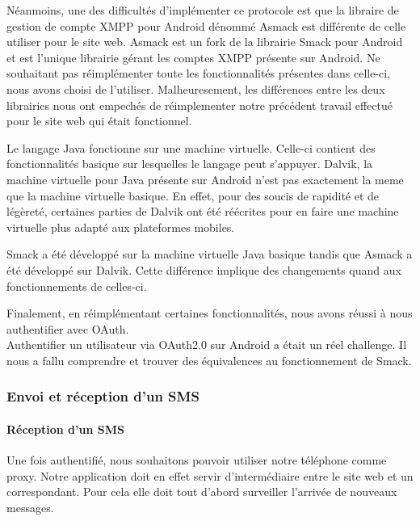 Néanmoins, une des difficultés d'implémenter ce protocole est que la libraire de gestion de compte
XMPP pour Android dénommé Asmack est différente de celle utiliser pour le site web. Asmack est un fork 
de la librairie Smack pour Android et est l'unique librairie gérant les comptes XMPP présente sur
Android. Ne souhaitant pas réimplémenter toute les fonctionnalités présentes dans celle-ci, nous avons
choisi de l'utiliser. Malheuresement, les différences entre les deux librairies nous ont empechés de 
réimplementer notre précédent travail effectué pour le site web qui était fonctionnel. 

Le langage Java fonctionne sur une machine virtuelle. Celle-ci contient des fonctionnalités basique sur
lesquelles le langage peut s'appuyer. Dalvik, la machine virtuelle pour Java présente sur Android n'est 
pas exactement la meme que la machine virtuelle basique. En effet, pour des soucis de rapidité et de 
légèreté, certaines parties de Dalvik ont été réécrites pour en faire une machine virtuelle plus adapté
aux plateformes mobiles.

Smack a été développé sur la machine virtuelle Java basique tandis que Asmack a été développé sur Dalvik.
Cette différence implique des changements quand aux fonctionnements de celles-ci. 

Finalement, en réimplémentant certaines fonctionnalités, nous avons réussi à nous authentifier avec OAuth.
\\


Authentifier un utilisateur via OAuth2.0 sur Android a était un réel challenge. Il nous a fallu comprendre 
et trouver des équivalences au fonctionnement de Smack. 



\subsubsection{Envoi et réception d'un SMS}


\paragraph{Réception d'un SMS}

Une fois authentifié, nous souhaitons pouvoir utiliser notre téléphone comme proxy. Notre application
doit en effet servir d'intermédiaire entre le site web et un correspondant. Pour cela elle doit tout
d'abord surveiller l'arrivée de nouveaux messages. 

